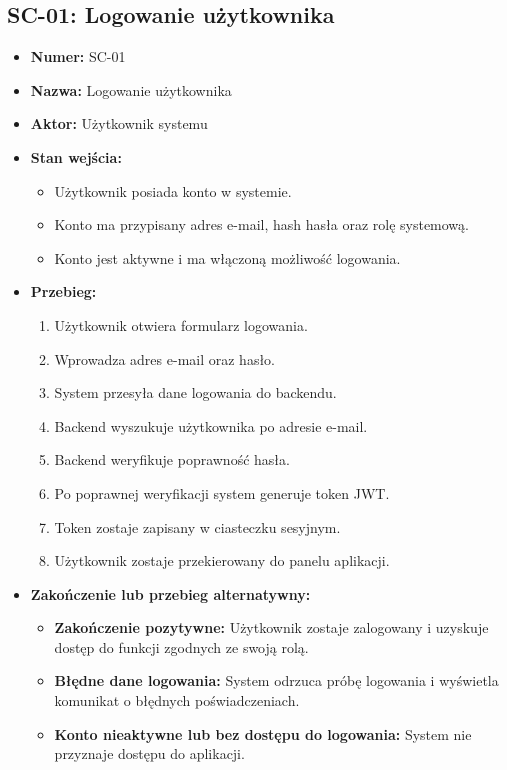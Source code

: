 \subsection{SC-01: Logowanie użytkownika}
\begin{itemize}
    \item \textbf{Numer:} SC-01
    \item \textbf{Nazwa:} Logowanie użytkownika
    \item \textbf{Aktor:} Użytkownik systemu
    \item \textbf{Stan wejścia:}
    \begin{itemize}
        \item Użytkownik posiada konto w systemie.
        \item Konto ma przypisany adres e-mail, hash hasła oraz rolę systemową.
        \item Konto jest aktywne i ma włączoną możliwość logowania.
    \end{itemize}
    \item \textbf{Przebieg:}
    \begin{enumerate}
        \item Użytkownik otwiera formularz logowania.
        \item Wprowadza adres e-mail oraz hasło.
        \item System przesyła dane logowania do backendu.
        \item Backend wyszukuje użytkownika po adresie e-mail.
        \item Backend weryfikuje poprawność hasła.
        \item Po poprawnej weryfikacji system generuje token JWT.
        \item Token zostaje zapisany w ciasteczku sesyjnym.
        \item Użytkownik zostaje przekierowany do panelu aplikacji.
    \end{enumerate}
    \item \textbf{Zakończenie lub przebieg alternatywny:}
    \begin{itemize}
        \item \textbf{Zakończenie pozytywne:} Użytkownik zostaje zalogowany i uzyskuje dostęp do funkcji zgodnych ze swoją rolą.
        \item \textbf{Błędne dane logowania:} System odrzuca próbę logowania i wyświetla komunikat o błędnych poświadczeniach.
        \item \textbf{Konto nieaktywne lub bez dostępu do logowania:} System nie przyznaje dostępu do aplikacji.
    \end{itemize}
\end{itemize}

